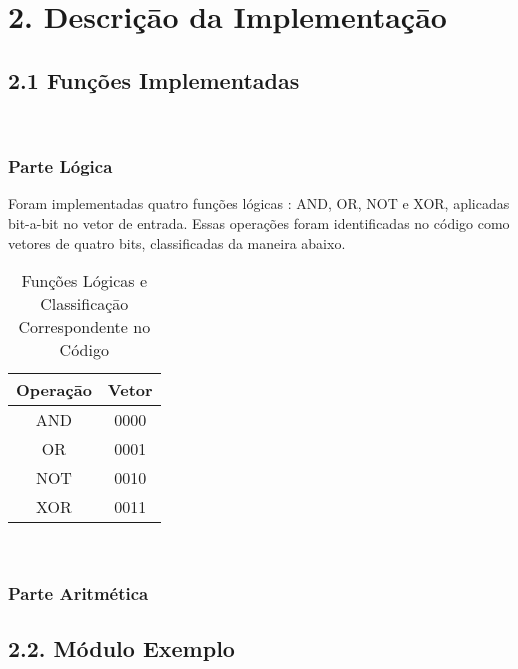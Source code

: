\section*{2. Descriçāo da Implementaçāo}

\subsection*{2.1 Funções Implementadas}

\\\subsubsection*{\textbf{Parte Lógica}}
\newline
Foram implementadas quatro funções lógicas : AND, OR, NOT e XOR, aplicadas bit-a-bit no vetor de entrada. Essas operações foram identificadas no código como vetores de quatro bits, classificadas da maneira abaixo.

\begin{table}[h]
    \centering
    \begin{tabular}{|c|c|}
     \hline Operaçāo & Vetor \\
     \hline AND & 0000\\
     \hline OR & 0001\\
     \hline NOT & 0010\\
     \hline XOR & 0011\\
    \hline

\end{tabular}
    \caption{Funções Lógicas e Classificaçāo Correspondente no Código}
    \label{tab:my_label}
\end{table}




\\\subsubsection*{\textbf{Parte Aritmética}}

\subsection*{2.2. Módulo Exemplo}
\inputminted{vhdl}{code/example.vhd}

